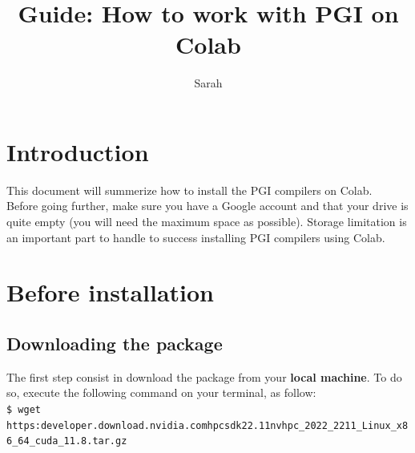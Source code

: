 \documentclass[10pt,a4paper]{article}
\author{Sarah}
\title{Guide: How to work with PGI on Colab}
\newcommand{\code}[1]{\colorbox{light-gray}{\texttt{#1}}}
\begin{document}
\maketitle{}
\newpage

\section{Introduction}
This document will summerize how to install the PGI compilers on Colab.\\
Before going further, make sure you have a Google account and that your drive is quite empty (you will need the maximum space as possible). Storage limitation is an important part to handle to success installing PGI compilers using Colab.\\

\section{Before installation}
\subsection{Downloading the package}
The first step consist in download the package from your \textbf{local machine}. To do so, execute the following command on your terminal, as follow:\\
{\small \code{\$ wget https:\/\/developer.download.nvidia.com\/hpc\-sdk\/22.11\/nvhpc\_2022\_2211\_Linux\_x86\_64\_cuda\_11.8.tar.gz}}\\
\end{document}
